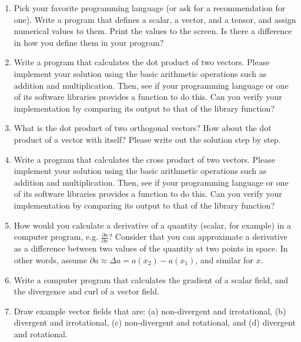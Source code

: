 \documentclass[12pt]{article}
\numberwithin{equation}{section}
\numberwithin{figure}{section}
\numberwithin{table}{section}
\begin{document}
\begin{enumerate}
  
  \item Pick your favorite programming language (or ask for a recommendation for one).
  Write a program that defines a scalar, a vector, and a tensor, and assign
  numerical values to them.
  Print the values to the screen.
  Is there a difference in how you define them in your program?

  \item Write a program that calculates the dot product of two vectors.
  Please implement your solution using the basic arithmetic operations such as
  addition and multiplication.
  Then, see if your programming language or one of its software libraries
  provides a function to do this.
  Can you verify your implementation by comparing its output to that of the
  library function?

  \item What is the dot product of two orthogonal vectors?
  How about the dot product of a vector with itself?
  Please write out the solution step by step.

  \item Write a program that calculates the cross product of two vectors.
  Please implement your solution using the basic arithmetic operations such as
  addition and multiplication.
  Then, see if your programming language or one of its software libraries
  provides a function to do this.
  Can you verify your implementation by comparing its output to that of the
  library function?

  \item How would you calculate a derivative of a quantity
  (scalar, for example) in a computer program, e.g. $\frac{\partial a}{\partial x}$?
  Consider that you can approximate a derivative as a difference between two
  values of the quantity at two points in space.
  In other words, assume $\partial a \approx \Delta a = a(x_2) - a(x_1)$,
  and similar for $x$.

  \item Write a computer program that calculates the gradient of a scalar field,
  and the divergence and curl of a vector field.
  
  \item Draw example vector fields that are: (a) non-divergent and irrotational,
  (b) divergent and irrotational, (c) non-divergent and rotational, and (d)
  divergent and rotational.
\end{enumerate}
\end{document}
